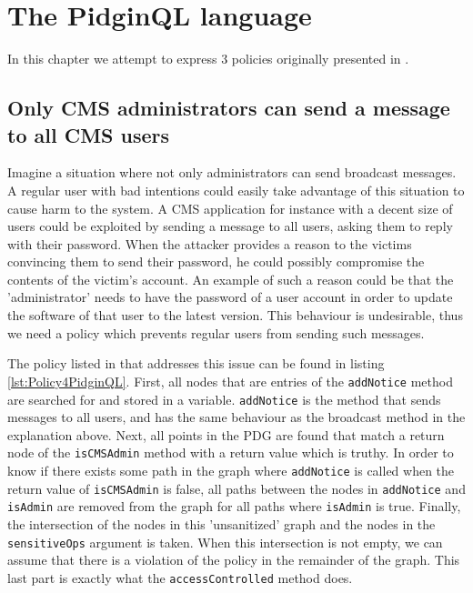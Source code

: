 \section{The PidginQL language}
\label{sec:ValidationPidginQL}

In this chapter we attempt to express 3 policies originally presented in \cite{PidginQLTechReport}.

\subsection{Only CMS administrators can send a message to all CMS users}
Imagine a situation where not only administrators can send broadcast messages. A regular user with bad intentions could easily take advantage of this situation to cause harm to the system. A CMS application for instance with a decent size of users could be exploited by sending a message to all users, asking them to reply with their password. When the attacker provides a reason to the victims convincing them to send their password, he could possibly compromise the contents of the victim's account. An example of such a reason could be that the 'administrator' needs to have the password of a user account in order to update the software of that user to the latest version. This behaviour is undesirable, thus we need a policy which prevents regular users from sending such messages.

The policy listed in \cite{PidginQLTechReport} that addresses this issue can be found in listing \ref{lst:Policy4PidginQL}. First, all nodes that are entries of the \texttt{addNotice} method are searched for and stored in a variable. \texttt{addNotice} is the method that sends messages to all users, and has the same behaviour as the broadcast method in the explanation above. Next, all points in the PDG are found that match a return node of the \texttt{isCMSAdmin} method with a return value which is truthy. In order to know if there exists some path in the graph where \texttt{addNotice} is called when the return value of \texttt{isCMSAdmin} is false, all paths between the nodes in \texttt{addNotice} and \texttt{isAdmin} are removed from the graph for all paths where \texttt{isAdmin} is true. Finally, the intersection of the nodes in this 'unsanitized' graph and the nodes in the \texttt{sensitiveOps} argument is taken. When this intersection is not empty, we can assume that there is a violation of the policy in the remainder of the graph. This last part is exactly what the \texttt{accessControlled} method does.

